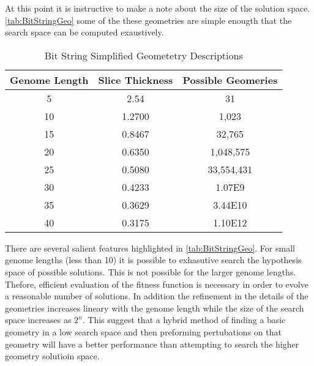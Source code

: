 At this point it is instructive to make a note about the size of the solution space.
\autoref{tab:BitStringGeo} some of the these geometries are simple enougth that the search space can be computed exaustively.
\begin{table}
    \caption[Genome Bit String Geometries]{Bit String Simplified Geometetry Descriptions}
    \label{tab:BitStringGeo}
    \centering
    \begin{tabular}{ c | c c}
     \toprule
     Genome Length&Slice Thickness&Possible Geomeries \\
     \midrule
        5&2.54&31\\
        10&1.2700&1,023\\
        15&0.8467&32,765\\
        20&0.6350&1,048,575\\
        25&0.5080&33,554,431\\
        30&0.4233&\num{1.07E9}\\
        35&0.3629&\num{3.44E10}\\
        40&0.3175&\num{1.10E12}\\
    \bottomrule
    \end{tabular}
\end{table}
There are several salient features highlighted in \autoref{tab:BitStringGeo}.
For small genome lengths (less than 10) it is possible to exhasutive search the hypothesis space of possible solutions.
This is not possible for the larger genome lengths.
Thefore, efficient evaluation of the fitness function is necessary in order to evolve a reasonable number of solutions.
In addition the refinement in the details of the geometries increases lineary with the genome length while the size of the search space increases as $2^n$.
This suggest that a hybrid method of finding a basic geometry in a low search space and then preforming pertubations on that geometry will have a better performance than attempting to search the higher geometry solutioin space.

